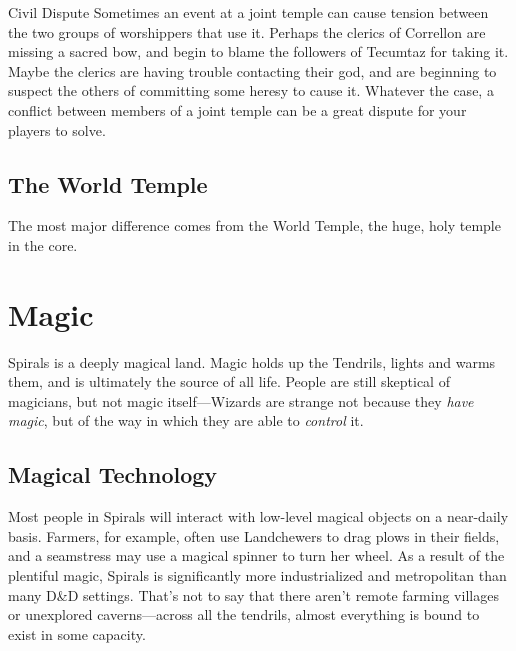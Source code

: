 \begin{multicols}{2}
\begin{adventureidea}{Civil Dispute}
Sometimes an event at a joint temple can cause tension between the two groups of worshippers that use it.
Perhaps the clerics of Correllon are missing a sacred bow, and begin to blame the followers of Tecumtaz for taking it.
Maybe the clerics are having trouble contacting their god, and are beginning to suspect the others of committing some heresy to cause it.
Whatever the case, a conflict between members of a joint temple can be a great dispute for your players to solve.
\end{adventureidea}

\subsection{The World Temple}
The most major difference comes from the World Temple, the huge, holy temple in the core.

\section{Magic}
Spirals is a deeply magical land.
Magic holds up the Tendrils, lights and warms them, and is ultimately the source of all life.
People are still skeptical of magicians, but not magic itself---Wizards are strange not because they \textit{have magic}, but of the way in which they are able to \textit{control} it.

\subsection{Magical Technology}
Most people in Spirals will interact with low-level magical objects on a near-daily basis.
Farmers, for example, often use Landchewers to drag plows in their fields, and a seamstress may use a magical spinner to turn her wheel.
As a result of the plentiful magic, Spirals is significantly more industrialized and metropolitan than many D\&D settings.
That's not to say that there aren't remote farming villages or unexplored caverns---across all the tendrils, almost everything is bound to exist in some capacity.


\end{multicols}
